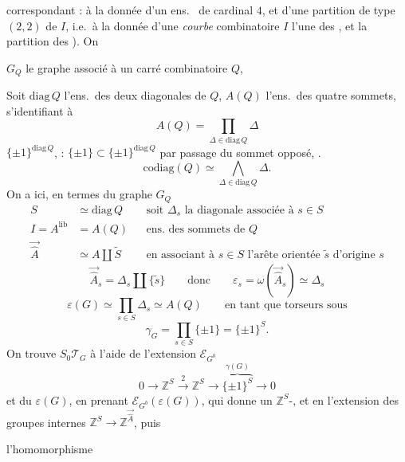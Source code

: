 \documentclass[11pt,a4paper]{article}
\begin{document}
correspondant : à la donnée d'un ens.\ \struck{\ill{}}  de cardinal $4$, et d'une partition de type $(2,2)$ de $I$, i.e.\ à la donnée d'une \textit{courbe} combinatoire  \ill{} $I$ \ill{} l'une des , et la partition \ill{} \ill{}  des \ill{} \ill{}). On 

$G_Q$ le graphe associé à un carré combinatoire $Q$,


Soit $\mathrm{diag}\,Q$ l'ens.\ des deux diagonales de $Q$,  $A(Q)$ l'ens.\ des quatre sommets, s'identifiant à
\[
  A(Q) = \prod_{\Delta \in \mathrm{diag}\,Q} \Delta
\]
  $\{\pm1\}^{\mathrm{diag}\,Q}$, 
\struck{\ill{}} \ill{} : $\{\pm1\} \subset \{\pm1\}^{\mathrm{diag}\,Q}$  par passage du sommet opposé, \struck{\ill{}}  . 
\[
  \mathrm{codiag}(Q) \simeq \bigwedge_{\Delta \in \mathrm{diag}\,Q} \Delta .
\]
On a ici, en termes du graphe $G_Q$
\[
  \begin{aligned}
    S &\simeq \mathrm{diag}\,Q && \text{soit $\Delta_s$ la diagonale associée à $s \in S$} \\
    I = A^{\mathrm{lib}} &= A(Q) && \text{ens.\ des sommets de $Q$} \\
    \vec{\hat A} &\simeq A \amalg \tilde S && \text{en associant à $s \in S$ l'arête orientée $\tilde s$ d'origine $s$}
  \end{aligned}
\]
\[
  \vec{\hat A}_s = \Delta_s \amalg \{\tilde s\}
  \qquad \text{donc} \qquad
  \varepsilon_s = \omega(\vec{\hat A}_s) \simeq \Delta_s
\]
\[
  \varepsilon(G) \simeq \prod_{s\in S} \Delta_s \simeq A(Q)
  \qquad \text{en tant que torseurs sous}
\]
\[
  \gamma_G = \prod_{s\in S} \{\pm1\} = \{\pm1\}^S .
\]
On trouve $S_0\mathcal{T}_G$ à l'aide de l'extension $\mathcal{E}_{G^b}$
\[
  0 \longrightarrow \mathbb{Z}^S \xrightarrow{\ 2\ } \mathbb{Z}^S \longrightarrow \overbrace{\{\pm1\}^S}^{\gamma(G)} \longrightarrow 0
\]
et du  $\varepsilon(G)$, en prenant $\mathcal{E}_{G^b}(\varepsilon(G))$,  qui donne un $\mathbb{Z}^S$-, et en  l'extension des groupes internes $\mathbb{Z}^S \to \mathbb{Z}^{\vec{\hat A}}$, puis

l'homomorphisme
\end{document}
